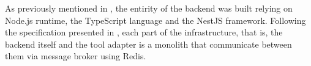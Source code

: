 As previously mentioned in , the entirity of the backend was built relying on Node.js runtime, the TypeScript language and the NestJS framework.
Following the specification presented in , each part of the infrastructure, that is, the backend itself and the tool adapter is a monolith that communicate between them via message broker using Redis.
